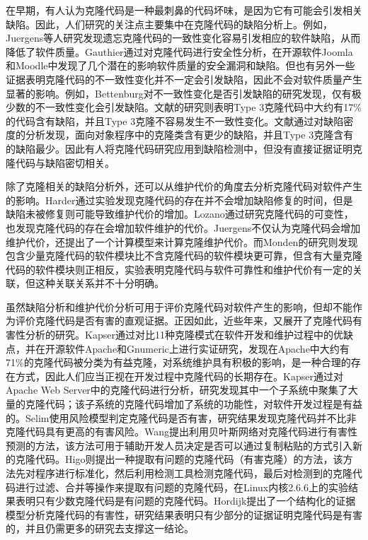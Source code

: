 在早期，有人认为克隆代码是一种最刺鼻的代码坏味，是因为它有可能会引发相关缺陷。因此，人们研究的关注点主要集中在克隆代码的缺陷分析上。例如，Juergens等人研究发现遗忘克隆代码的一致性变化容易引发相应的软件缺陷，从而降低了软件质量\cite{juergens2009code,inoue2012experience}。Gauthier通过对克隆代码进行安全性分析，在开源软件Joomla和Moodle中发现了几个潜在的影响软件质量的安全漏洞和缺陷\cite{gauthier2013uncovering}。但也有另外一些证据表明克隆代码的不一致性变化并不一定会引发缺陷，因此不会对软件质量产生显著的影响。例如，Bettenburg对不一致性变化是否引发缺陷的研究发现，仅有极少数的不一致性变化会引发缺陷\cite{bettenburg2009empirical}。文献\cite{wagner2016relationship}的研究则表明Type 3克隆代码中大约有17\%的代码含有缺陷，并且Type 3克隆不容易发生不一致性变化。文献\cite{elish2015fault}通过对缺陷密度的分析发现，面向对象程序中的克隆类含有更少的缺陷，并且Type 3克隆含有的缺陷最少。因此有人将克隆代码研究应用到缺陷检测中，但没有直接证据证明克隆代码与缺陷密切相关\cite{lo2012active,kamei2011empirical}。

除了克隆相关的缺陷分析外，还可以从维护代价的角度去分析克隆代码对软件产生的影响\cite{bakota2007clone}。Harder通过实验发现克隆代码的存在并不会增加缺陷修复的时间，但是缺陷未被修复则可能导致维护代价的增加\cite{harder2012controlled}。Lozano通过研究克隆代码的可变性，也发现克隆代码的存在会增加软件维护的代价\cite{lozano2008assessing}。Juergens不仅认为克隆代码会增加维护代价，还提出了一个计算模型来计算克隆维护代价\cite{juergens2010much}。而Monden的研究则发现包含少量克隆代码的软件模块比不含克隆代码的软件模块更可靠，但含有大量克隆代码的软件模块则正相反，实验表明克隆代码与软件可靠性和维护代价有一定的关联，但这种关联关系并不十分明确\cite{monden2002software}。

虽然缺陷分析和维护代价分析可用于评价克隆代码对软件产生的影响，但却不能作为评价克隆代码是否有害的直观证据。正因如此，近些年来，又展开了克隆代码有害性分析的研究。Kapser通过对比11种克隆模式在软件开发和维护过程中的优缺点，并在开源软件Apache和Gnumeric上进行实证研究，发现在Apache中大约有71\%的克隆代码被分类为有益克隆，对系统维护具有积极的影响，是一种合理的存在方式，因此人们应当正视在开发过程中克隆代码的长期存在\cite{kapser2006cloning,kapser2008cloning}。Kapser通过对Apache Web Server中的克隆代码进行分析，研究发现其中一个子系统中聚集了大量的克隆代码；该子系统的克隆代码增加了系统的功能性，对软件开发过程是有益的\cite{kapser2006supporting}。Selim使用风险模型判定克隆代码是否有害，研究结果发现克隆代码并不比非克隆代码具有更高的有害风险\cite{selim2010studying}。Wang提出利用贝叶斯网络对克隆代码进行有害性预测的方法\cite{wang2012can}，该方法可用于辅助开发人员决定是否可以通过复制粘贴的方式引入新的克隆代码。Higo则提出一种提取有问题的克隆代码（有害克隆）的方法，该方法先对程序进行标准化，然后利用检测工具检测克隆代码，最后对检测到的克隆代码进行过滤、合并等操作来提取有问题的克隆代码，在Linux内核2.6.6上的实验结果表明只有少数克隆代码是有问题的克隆代码\cite{higo2009problematic}。Hordijk提出了一个结构化的证据模型分析克隆代码的有害性，研究结果表明只有少部分的证据证明克隆代码是有害的，并且仍需更多的研究去支撑这一结论\cite{hordijk2009harmfulness}。

